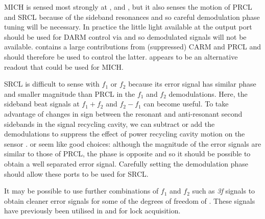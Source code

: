 \gls{MICH} is sensed most strongly at \ASSECOND{}, \POPFIRST{} and \REFLSUM{}, but it also senses the motion of \gls{PRCL} and \gls{SRCL} because of the sideband resonances and so careful demodulation phase tuning will be necessary. In practice the little light available at the output port should be used for \gls{DARM} control via \ASDC{} and so demodulated signals will not be available. \POPFIRST{} contains a large contributions from (suppressed) \gls{CARM} and \gls{PRCL} and should therefore be used to control the latter. \POPSECOND{} appears to be an alternative readout that could be used for \gls{MICH}.

\gls{SRCL} is difficult to sense with $f_1$ or $f_2$ because its error signal has similar phase and smaller magnitude than \gls{PRCL} in the $f_1$ and $f_2$ demodulations. Here, the sideband beat signals at $f_1 + f_2$ and $f_2 - f_1$ can become useful. To take advantage of changes in sign between the resonant and anti-resonant second sidebands in the signal recycling cavity, we can subtract or add the demodulations to suppress the effect of power recycling cavity motion on the sensor \cite{Effler2014}. \REFLSUM{} or \REFLDIFF{} seem like good choices: although the magnitude of the error signals are similar to those of \gls{PRCL}, the phase is opposite and so it should be possible to obtain a well separated error signal. Carefully setting the demodulation phase should allow these ports to be used for \gls{SRCL}.

It may be possible to use further combinations of $f_1$ and $f_2$ such as \emph{3f} signals to obtain cleaner error signals for some of the degrees of freedom of \ETLF{}. These signals have previously been utilised in \VIRGO{} \cite{Acernese2008} and \ALIGO{} \cite{Staley2014} for lock acquisition.

